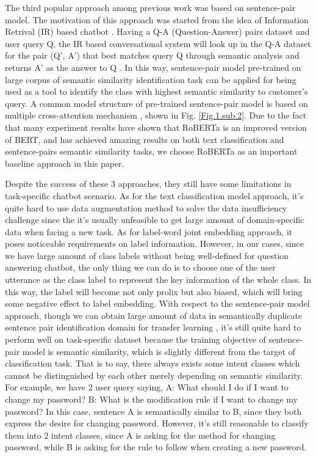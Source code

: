 \documentclass[letterpaper]{article} %
\begin{document}
  The  third  popular  approach  among  previous work was based on sentence-pair
  model.  The  motivation  of  this  approach  was  started  from  the  idea  of
  Information     Retrival    (IR)    based    chatbot \cite{jafarpour2010filter,
  leuski2011npceditor}.  Having  a  Q-A (Question-Answer) pairs dataset and user
  query  Q,  the  IR based conversational system will look up in the Q-A dataset
  for  the pair (Q', A') that best matches query Q through semantic analysis and
  returns   A'   as   the  answer  to  Q \cite{mnasri2019recent}.  In  this  way,
  sentence-pair  model  pre-trained  on  large  corpus  of  semantic  similarity
  identification  task  can  be applied for being used as a tool to identify the
  class  with  highest  semantic  similarity to customer's query. A common model
  structure  of pre-trained \cite{devlin2018bert} sentence-pair model is based on
  multiple  cross-attention  mechanism \cite{barkan2020scalable},  shown  in Fig.
  \ref{Fig.1.sub.2}.  Due  to  the  fact that many experiment results have shown
  that  RoBERTa \cite{liu2019roberta}  is  an  improved  version of BERT, and has
  achieved  amazing  results  on  both  text  classification  and sentence-pairs
  semantic similarity tasks, we choose RoBERTa as an important baseline approach
  in this paper.

  Despite the success of these 3 approaches, they still have some limitations in
  task-specific chatbot scenario. As for the text classification model approach,
  it's   quite   hard  to  use  data  augmentation  method  to  solve  the  data
  insufficiency  challenge since the it's usually unfeasible to get large amount
  of  domain-specific  data  when  facing  a  new  task. As for label-word joint
  embedding  approach,  it  poses  noticeable requirements on label information.
  However,  in  our  cases,  since  we have large amount of class labels without
  being well-defined for question answering chatbot, the only thing we can do is
  to  choose  one  of the user utterance as the class label to represent the key
  information  of  the  whole class. In this way, the label will become not only
  prolix  but  also  biased,  which  will  bring  some  negative effect to label
  embedding.  With  respect  to  the sentence-pair model approach, though we can
  obtain   large   amount  of  data  in  semantically  duplicate  sentence  pair
  identification  domain  for  transfer  learning \cite{sun2019fine},  it's still
  quite  hard  to  perform  well  on  task-specific dataset because the training
  objective  of  sentence-pair  model  is semantic similarity, which is slightly
  different from the target of classification task. That is to say, there always
  exists  some intent classes which cannot be distinguished by each other merely
  depending on semantic similarity. For example, we have 2 user query saying, A:
  What  should I do if I want to change my password? B: What is the modification
  rule if I want to change my password? In this case, sentence A is semantically
  similar  to  B,  since  they  both  express  the desire for changing password.
  However, it's still reasonable to classify them into 2 intent classes, since A
  is asking for the method for changing password, while B is asking for the rule
  to follow when creating a new password.
\end{document}
